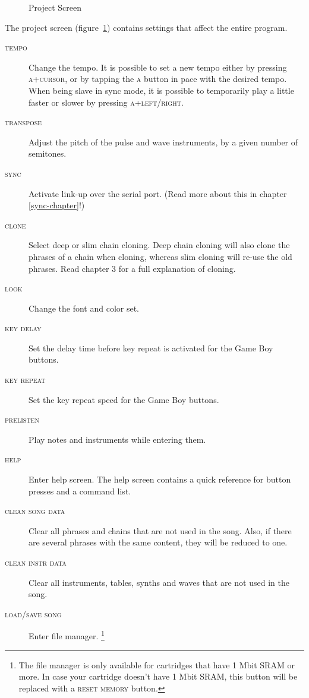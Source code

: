 \begin{figure}[htpb]
	\begin{center}
	\end{center}
	\caption{Project Screen}
	\label{fig:project}
\end{figure}

The project screen (figure~\ref{fig:project}) contains settings that affect the entire program.

\begin{description}
	\item[\textsc{tempo}] Change the tempo. It is possible to set a new tempo either by pressing
\textsc{a+cursor}, or by tapping the \textsc{a} button in pace with the desired tempo. When being
slave in sync mode, it is possible to temporarily play a little faster or slower by pressing \textsc{a+left/right}.
	\item[\textsc{transpose}] Adjust the pitch of the pulse and wave instruments, by a given number of semitones.
	\item[\textsc{sync}] Activate link-up over the serial port. (Read more about this in chapter \ref{sync-chapter}!)
	\item[\textsc{clone}] Select deep or slim chain cloning. Deep chain cloning will also clone the phrases of a chain when cloning, whereas slim cloning will re-use the old phrases. Read chapter 3 for a full explanation of cloning.
	\item[\textsc{look}] Change the font and color set.
	\item[\textsc{key delay}] Set the delay time before key repeat is activated for the Game Boy buttons.
	\item[\textsc{key repeat}] Set the key repeat speed for the Game Boy buttons.
	\item[\textsc{prelisten}] Play notes and instruments while entering them.
	\item[\textsc{help}] Enter help screen. The help screen contains a quick reference for button presses and a command list.

	\item[\textsc{clean song data}] Clear all phrases and chains that are not used in the song. Also, if there are several phrases with the same content, they will be reduced to one. \label{clean-song-data}
	\item[\textsc{clean instr data}] Clear all instruments, tables, synths and waves that are not used in the song.
	\item[\textsc{load/save song}] Enter file manager. \footnote{The file manager is only available for cartridges that have 1 Mbit SRAM or more. In case your cartridge doesn't have 1 Mbit SRAM, this button will be replaced with a \textsc{reset memory} button.}
\end{description}

